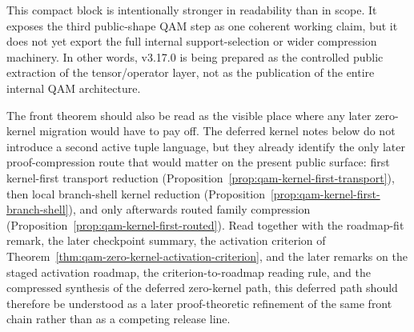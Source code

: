 \begin{remark}
This compact block is intentionally stronger in readability than in scope. It exposes the third public-shape QAM step as one coherent working claim, but it does not yet export the full internal support-selection or wider compression machinery. In other words, v3.17.0 is being prepared as the controlled public extraction of the tensor/operator layer, not as the publication of the entire internal QAM architecture.
\end{remark}

\begin{remark}
The front theorem should also be read as the visible place where any later zero-kernel migration would have to pay off. The deferred kernel notes below do not introduce a second active tuple language, but they already identify the only later proof-compression route that would matter on the present public surface: first kernel-first transport reduction (Proposition~\ref{prop:qam-kernel-first-transport}), then local branch-shell kernel reduction (Proposition~\ref{prop:qam-kernel-first-branch-shell}), and only afterwards routed family compression (Proposition~\ref{prop:qam-kernel-first-routed}). Read together with the roadmap-fit remark, the later checkpoint summary, the activation criterion of Theorem~\ref{thm:qam-zero-kernel-activation-criterion}, and the later remarks on the staged activation roadmap, the criterion-to-roadmap reading rule, and the compressed synthesis of the deferred zero-kernel path, this deferred path should therefore be understood as a later proof-theoretic refinement of the same front chain rather than as a competing release line.
\end{remark}

